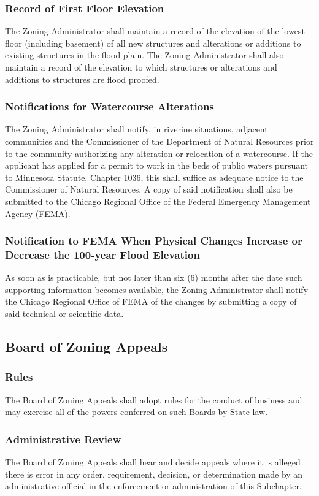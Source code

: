 \subsubsection{Record of First Floor Elevation}
The Zoning Administrator shall maintain a record of the elevation of the lowest floor (including basement) of all new structures and alterations or additions to existing structures in the flood plain. The Zoning Administrator shall also maintain a record of the elevation to which structures or alterations and additions to structures are flood proofed.
\subsubsection{Notifications for Watercourse Alterations}
The Zoning Administrator shall notify, in riverine situations, adjacent communities and the Commissioner of the Department of Natural Resources prior to the community authorizing any alteration or relocation of a watercourse. If the applicant has applied for a permit to work in the beds of public waters pursuant to Minnesota Statute, Chapter 1036, this shall suffice as adequate notice to the Commissioner of Natural Resources. A copy of said notification shall also be submitted to the Chicago Regional Office of the Federal Emergency Management Agency (FEMA).
\subsubsection{Notification to FEMA When Physical Changes Increase or Decrease the 100-year Flood Elevation}
As soon as is practicable, but not later than six (6) months after the date such supporting information becomes available, the Zoning Administrator shall notify the Chicago Regional Office of FEMA of the changes by submitting a copy of said technical or scientific data.
\subsection{Board of Zoning Appeals}
\subsubsection{Rules}
The Board of Zoning Appeals shall adopt rules for the conduct of business and may exercise all of the powers conferred on such Boards by State law.
\subsubsection{Administrative Review}
The Board of Zoning Appeals shall hear and decide appeals where it is alleged there is error in any order, requirement, decision, or determination made by an administrative official in the enforcement or administration of this Subchapter.
